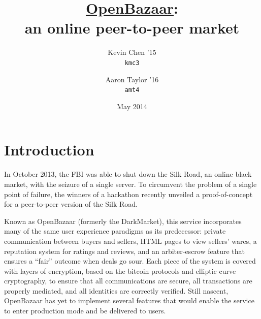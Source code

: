 \documentclass[11pt,twocolumn]{article}
\title{\bf \sc \href{https://github.com/OpenBazaar/OpenBazaar}{OpenBazaar}: \\ an online peer-to-peer market}
\author{
    {\rm Kevin Chen '15} \\
    {\tt kmc3}
    \and 
    {\rm Aaron Taylor '16} \\
    {\tt amt4}
}
\date{May 2014}
\begin{document}
\maketitle

\doublespacing


\newcommand{\OpenBazaar}{}
\def\OpenBazaar/{{\sc OpenBazaar}}

\newcommand{\Kademlia}{}
\def\Kademlia/{{\sc Kademlia}}

\newcommand{\Entangled}{}
\def\Entangled/{{\sc Entangled}}

\newcommand{\Twisted}{}
\def\Twisted/{{\sc Twisted}}

\newcommand{\Tornado}{}
\def\Tornado/{{\sc Tornado}}

\newcommand{\reactor}{}
\def\reactor/{{\sc reactor}}

\newcommand{\ZMQ}{}
\def\ZMQ/{\O{}MQ}

\newcommand{\kv}{}
\def\kv/{$\langle$key,value$\rangle$}

\newcommand{\findNode}{}
\def\findNode/{{\sc find\_node}}

\newcommand{\findValue}{}
\def\findValue/{{\sc find\_value}}

\newcommand{\ping}{}
\def\ping/{{\sc ping}}

\newcommand{\store}{}
\def\store/{{\sc store}}

\newcommand{\delete}{}
\def\delete/{{\sc delete}}






\section{Introduction}
In October 2013, the FBI was able to shut down the Silk Road, an online black market, with the seizure of a single server.
To circumvent the problem of a single point of failure, the winners of a hackathon recently unveiled a proof-of-concept for a peer-to-peer version of the Silk Road.

Known as \OpenBazaar/ (formerly the DarkMarket), this service incorporates many of the same user experience paradigms as its predecessor: private communication between buyers and sellers, HTML pages to view sellers' wares, a reputation system for ratings and reviews, and an arbiter-escrow feature that ensures a ``fair'' outcome when deals go sour.
Each piece of the system is covered with layers of encryption, based on the bitcoin protocols and elliptic curve cryptography, to ensure that all communications are secure, all transactions are properly mediated, and all identities are correctly verified.
Still nascent, \OpenBazaar/ has yet to implement several features that would enable the service to enter production mode and be delivered to users.
\end{document}
